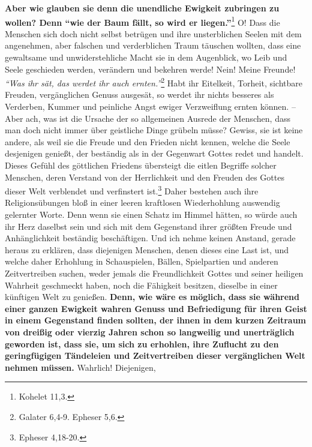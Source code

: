 \label{ref:15_06_langeweile}
\textbf{Aber wie glauben sie denn die unendliche Ewigkeit zubringen zu wollen?
Denn
"`wie der Baum fällt, so wird er liegen."'}\footnote{Kohelet 11,3. }
O! Dass die Menschen sich doch nicht selbst
betrügen und ihre unsterblichen Seelen mit dem angenehmen, aber falschen und
verderblichen Traum täuschen wollten, dass eine gewaltsame und unwiderstehliche
Macht sie in dem Augenblick, wo Leib und Seele geschieden werden, verändern und
bekehren werde! Nein! Meine Freunde!
\textit{"`Was ihr sät, das werdet ihr auch ernten."'}\footnote{Galater 6,4-9.
Epheser 5,6.}
Habt ihr Eitelkeit, Torheit,
sichtbare Freuden, vergänglichen Genuss ausgesät, so werdet ihr nichts besseres
als Verderben, Kummer und peinliche Angst ewiger Verzweiflung ernten können. --
Aber ach, was ist die Ursache der so allgemeinen Ausrede der Menschen, dass man
doch nicht immer über geistliche Dinge grübeln müsse? Gewiss, sie ist keine
andere, als weil sie die Freude und den Frieden nicht kennen, welche die Seele
desjenigen genießt, der beständig als in der Gegenwart
Gottes redet und handelt.
Dieses Gefühl des göttlichen Friedens übersteigt die eitlen Begriffe solcher
Menschen, deren Verstand von der Herrlichkeit und den Freuden des Gottes dieser
Welt verblendet und verfinstert ist.\footnote{Epheser 4,18-20.}
Daher bestehen
auch ihre Religionsübungen bloß in einer leeren kraftlosen Wiederhohlung
auswendig gelernter Worte. Denn wenn sie einen Schatz im Himmel hätten, so würde
auch ihr Herz daselbst sein und sich mit dem Gegenstand ihrer größten Freude
und Anhänglichkeit beständig beschäftigen. Und ich nehme keinen Anstand, gerade
heraus zu erklären, dass diejenigen Menschen, denen dieses eine Last ist, und
welche daher Erhohlung in Schauspielen, Bällen, Spielpartien
und anderen
Zeitvertreiben suchen, weder jemals die Freundlichkeit Gottes und seiner
heiligen Wahrheit geschmeckt haben, noch die Fähigkeit besitzen, dieselbe in
einer künftigen Welt zu genießen. \textbf{Denn, wie wäre es möglich, dass sie
während
einer ganzen Ewigkeit wahren Genuss und Befriedigung für ihren Geist in einem
Gegenstand finden sollten, der ihnen in dem kurzen Zeitraum von dreißig oder
vierzig Jahren schon so langweilig und unerträglich geworden ist, dass sie, um
sich zu erhohlen, ihre Zuflucht zu den geringfügigen Tändeleien und
Zeitvertreiben dieser vergänglichen Welt nehmen müssen.} Wahrlich! Diejenigen,
